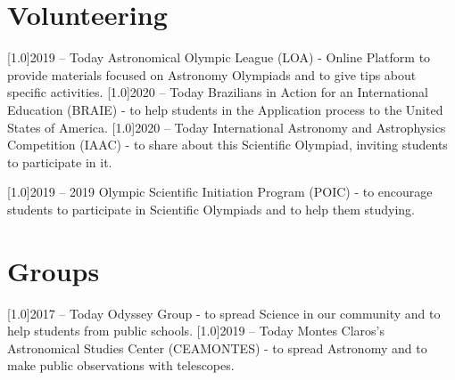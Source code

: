 \documentclass{cv-style}
\begin{document}
\section{Volunteering}
    \vspace{-0.2cm}
    \begin{entrylist}
        \entry
            {\scalebox{.8}[1.0]{2019 -- Today}}
            {Astronomical Olympic League (LOA) - {}}
            {Online Platform}
            { to provide materials focused on Astronomy Olympiads and to give tips about specific activities.}
        \entry 
            {\scalebox{.8}[1.0]{2020 -- Today}}
            {Brazilians in Action for an International Education (BRAIE) - }
            {}
            { to help students in the Application process to the United States of America.}
        \entry
            {\scalebox{.8}[1.0]{2020 -- Today}}
            {International Astronomy and Astrophysics Competition (IAAC) - }
            {}
            { to share about this Scientific Olympiad, inviting students to participate in it.}
    \end{entrylist}
\newpage
    \begin{entrylist}
        \entry
            {\scalebox{.8}[1.0]{2019 -- 2019}}
            {Olympic Scientific Initiation Program (POIC) - {}}
            {}
            { to encourage students to participate in Scientific Olympiads and to help them studying.}
    \end{entrylist}

\section{Groups}
    \vspace{-0.2cm}
    \begin{entrylist}
        \entry
            {\scalebox{.8}[1.0]{2017 -- Today}}
            {Odyssey Group - {}}
            {}
            { to spread Science in our community and to help students from public schools.}
        \entry
            {\scalebox{.8}[1.0]{2019 -- Today}}
            {Montes Claros's Astronomical Studies Center (CEAMONTES) - {}}
            {}
            { to spread Astronomy and to make public observations with telescopes.}
    \end{entrylist}
\end{document}
